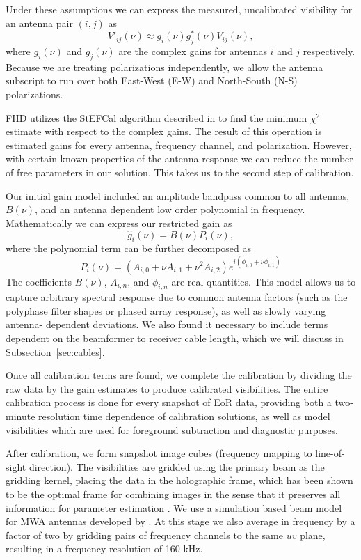 \documentclass[iop]{emulateapj}
\begin{document}
Under these assumptions we can express the measured, uncalibrated visibility for an 
antenna pair $(i,j)$ as
\begin{equation}
V'_{ij}(\nu) \approx g_i(\nu)g^*_j(\nu)V_{ij}(\nu),
\end{equation}
where $g_i(\nu)$ and $g_j(\nu)$ are the complex gains for antennas $i$ and $j$ 
respectively. Because we are treating polarizations independently, we allow the antenna 
subscript to run over both East-West (E-W) and North-South (N-S) polarizations.

FHD utilizes the StEFCal algorithm described in \citealt{Salvini:2014} to find the minimum 
$\chi^2$ estimate with respect to the complex gains. The result of this operation is 
estimated gains for every antenna, frequency channel, and polarization. However, with 
certain known properties of the antenna response we can reduce the number of free 
parameters in our solution. This takes us to the second step of calibration.

Our initial gain model included an amplitude bandpass common to all antennas, $B(\nu)$, 
and an antenna dependent low order polynomial in frequency. Mathematically we can 
express our restricted gain as
\begin{equation}\label{eq:cal1}
\hat{g}_i(\nu)=B(\nu)P_i(\nu),
\end{equation}
where the polynomial term can be further decomposed as
\begin{equation}
P_i(\nu) = (A_{i,0} + \nu A_{i,1} + \nu^2 A_{i,2})e^{i (\phi_{i,0} + \nu \phi_{i,1})}
\end{equation}
The coefficients $B(\nu)$, $A_{i,n}$, and $\phi_{i,n}$ are real quantities. This model allows 
us to capture arbitrary spectral response due to common antenna factors (such as the 
polyphase filter shapes or phased array response), as well as slowly varying antenna-
dependent deviations. We also found it necessary to include terms dependent on the 
beamformer to receiver cable length, which we will discuss in Subsection~\ref{sec:cables}.

Once all calibration terms are found, we complete the calibration by dividing the raw data by 
the gain estimates to produce calibrated visibilities. The entire calibration process is done 
for every snapshot of EoR data, providing both a two-minute resolution time dependence of 
calibration solutions, as well as model visibilities which are used for foreground subtraction 
and diagnostic purposes.

After calibration, we form snapshot image cubes (frequency mapping to line-of-sight 
direction). The visibilities are gridded using the primary beam as the gridding kernel, placing 
the data in the holographic frame, which has been shown to be the optimal frame for 
combining images in the sense that it preserves all information for parameter estimation 
\citep{Morales:2009,Bhatnagar:2008}. We use a simulation based beam model for MWA 
antennas developed by \citealt{Sutinjo:2015}. At this stage we also average in frequency by 
a factor of two by gridding pairs of frequency channels to the same $uv$ plane, resulting in 
a frequency resolution of 160 kHz. 
\end{document}
